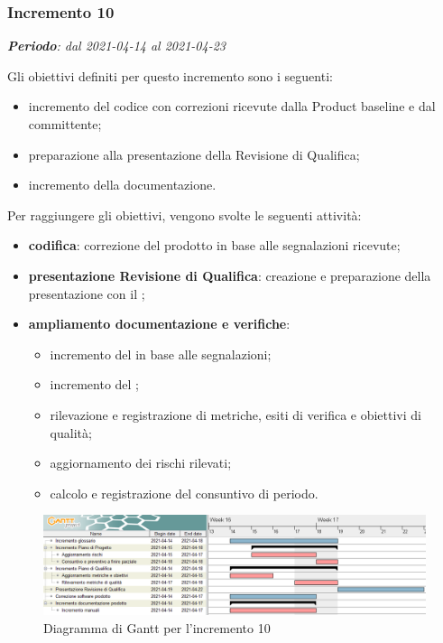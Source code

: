 \subsubsection{Incremento 10}
\textit{\textbf{Periodo}: dal 2021-04-14 al 2021-04-23}

Gli obiettivi definiti per questo incremento sono i seguenti:
\begin{itemize}
\item incremento del codice con correzioni ricevute dalla Product baseline e dal committente;
\item preparazione alla presentazione della Revisione di Qualifica;
\item incremento della documentazione.
\end{itemize}

Per raggiungere gli obiettivi, vengono svolte le seguenti attività:
\begin{itemize}
\item \textbf{codifica}: correzione del prodotto in base alle segnalazioni ricevute;
\item \textbf{presentazione Revisione di Qualifica}: creazione e preparazione della presentazione con il \VT{};
\item \textbf{ampliamento documentazione e verifiche}:
\begin{itemize}
\item incremento del \textit{\MM{}} in base alle segnalazioni;
\item incremento del ;
\item rilevazione e registrazione di metriche, esiti di verifica e obiettivi di qualità;
\item aggiornamento dei rischi rilevati;
\item calcolo e registrazione del consuntivo di periodo.
\end{itemize}

\end{itemize}
\begin{figure}[H]
\centering

\centerline{\includegraphics[scale=0.6]{res/Pianificazione/Fasi/CodificaIncrementi/ganttIncremento10}}
\caption{Diagramma di Gantt per l'incremento 10}
\end{figure}
